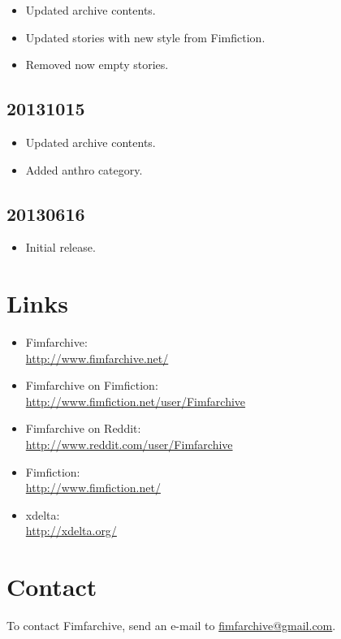 \documentclass[hidelinks,a4paper,12pt]{article}
\begin{document}
\begin{itemize}
\item Updated archive contents.
\item Updated stories with new style from Fimfiction.
\item Removed now empty stories.
\end{itemize}

\subsection{20131015} \label{sec:changelog_20131015}

\begin{itemize}
\item Updated archive contents.
\item Added anthro category.
\end{itemize}

\subsection{20130616} \label{sec:changelog_20130616}

\begin{itemize}
\item Initial release.
\end{itemize}


\section{Links} \label{sec:links}

\begin{itemize}
\item Fimfarchive: \\ \url{http://www.fimfarchive.net/}
\item Fimfarchive on Fimfiction: \\ \url{http://www.fimfiction.net/user/Fimfarchive}
\item Fimfarchive on Reddit: \\ \url{http://www.reddit.com/user/Fimfarchive}
\item Fimfiction: \\ \url{http://www.fimfiction.net/}
\item xdelta: \\ \url{http://xdelta.org/}
\end{itemize}


\section{Contact} \label{sec:contact}

To contact Fimfarchive, send an e-mail to \href{mailto:fimfarchive@gmail.com}{fimfarchive@gmail.com}.
\end{document}
